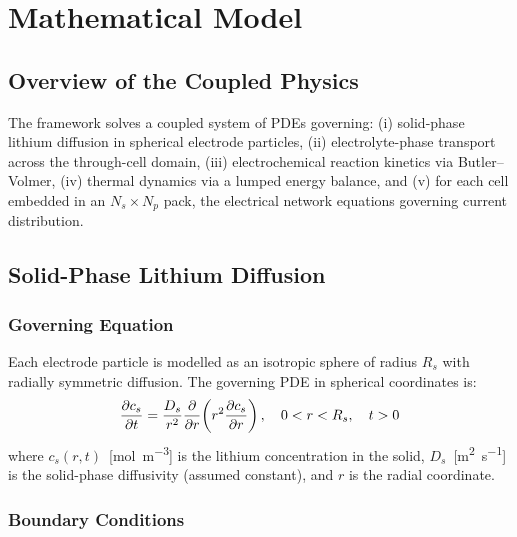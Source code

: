 \chapter{Mathematical Model}
\label{ch:math_model}

\section{Overview of the Coupled Physics}

The \VIBE{} framework solves a coupled system of PDEs governing:
(i) solid-phase lithium diffusion in spherical electrode particles,
(ii) electrolyte-phase transport across the through-cell domain,
(iii) electrochemical reaction kinetics via Butler--Volmer,
(iv) thermal dynamics via a lumped energy balance, and
(v) for each cell embedded in an $N_s \times N_p$ pack, the electrical
network equations governing current distribution.

\section{Solid-Phase Lithium Diffusion}
\label{sec:solid_diffusion}

\subsection{Governing Equation}

Each electrode particle is modelled as an isotropic sphere of radius $R_s$ with radially symmetric diffusion. The governing PDE in spherical coordinates is:
\begin{equation}
  \dfrac{\partial c_s}{\partial t} = \frac{D_s}{r^2}\dfrac{\partial }{\partial r}\!\left(r^2\dfrac{\partial c_s}{\partial r}\right),
  \quad 0 < r < R_s,\quad t > 0
  \label{eq:solid_diff}
\end{equation}
where $c_s(r,t)$~[\si{\mol\per\meter\cubed}] is the lithium concentration in the solid, $D_s$~[\si{\meter\squared\per\second}] is the solid-phase diffusivity (assumed constant), and $r$ is the radial coordinate.

\subsection{Boundary Conditions}

